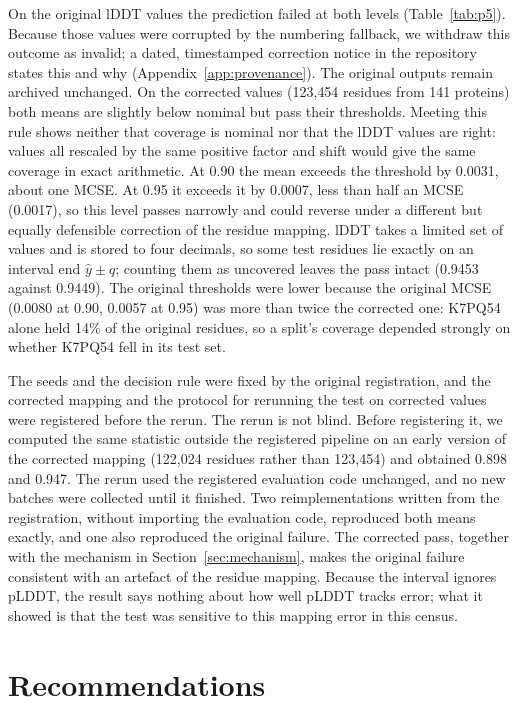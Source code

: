 \documentclass{article}
\begin{document}
On the original lDDT values the prediction failed at both levels
(Table~\ref{tab:p5}). Because those values were corrupted by the numbering fallback, we withdraw this outcome as invalid; a dated, timestamped correction
notice in the repository states this and why (Appendix~\ref{app:provenance}).
The original outputs remain archived unchanged. On the corrected values
(123{,}454 residues from 141 proteins) both means are slightly below nominal but pass their thresholds. Meeting this rule shows neither that coverage is nominal nor that the lDDT values are right: values all rescaled by the same positive factor and shift would give the same coverage in exact arithmetic. At 0.90 the mean exceeds the threshold by 0.0031,
about one MCSE. At 0.95 it exceeds it by 0.0007, less than half an MCSE
(0.0017), so this level passes narrowly and could reverse under a different
but equally defensible correction of the residue mapping. lDDT takes a limited set of values and is stored to four decimals, so some test residues lie exactly on an interval end
$\hat y \pm q$; counting them as uncovered leaves the pass intact (0.9453
against 0.9449). The original thresholds were lower because the original
MCSE (0.0080 at 0.90, 0.0057 at 0.95) was more than twice the corrected one:
K7PQ54 alone held 14\% of the original residues, so a split's coverage
depended strongly on whether K7PQ54 fell in its test set.

The seeds and the decision rule were fixed by the original registration, and
the corrected mapping and the protocol for rerunning the test on corrected
values were registered before the rerun. The rerun is not blind. Before
registering it, we computed the same statistic outside the registered
pipeline on an early version of the corrected mapping (122{,}024 residues
rather than 123{,}454) and obtained 0.898 and 0.947. The rerun used the
registered evaluation code unchanged, and no new batches were collected
until it finished. Two reimplementations written from the registration,
without importing the evaluation code, reproduced both means exactly, and
one also reproduced the original failure. The corrected pass, together with
the mechanism in Section~\ref{sec:mechanism}, makes the original failure
consistent with an artefact of the residue mapping. Because the interval ignores pLDDT, the result says nothing about how well pLDDT tracks error; what it showed is that the test was sensitive to this mapping error in this census.

\section{Recommendations}
\label{sec:recommendations}
\end{document}

